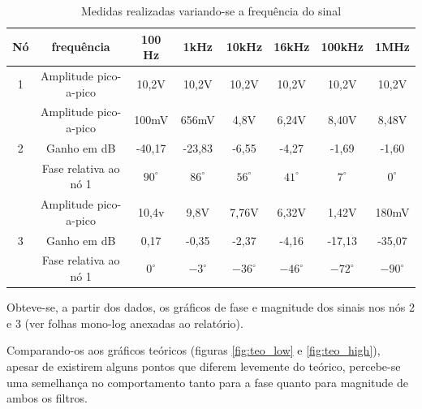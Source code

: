 \documentclass[a4paper]{article} %
\begin{document}

%
\begin{table}[h]
\begin{centering}
\caption{Medidas realizadas variando-se a frequência do sinal \label{tab:var-freq}}
\begin{tabular}{|c|c|c|c|c|c|c|c|}
\hline 
Nó & frequência & 100 Hz & 1kHz & 10kHz & 16kHz & 100kHz & 1MHz\tabularnewline
\hline
\hline 
1 & Amplitude pico-a-pico & 10,2V & 10,2V  & 10,2V & 10,2V & 10,2V  &10,2V \tabularnewline
\hline 
\multirow{3}{*}{2}
 & Amplitude pico-a-pico & 100mV & 656mV & 4,8V & 6,24V & 8,40V & 8,48V \tabularnewline
\cline{2-8} 
 & \multicolumn{1}{c|}{Ganho em dB} & -40,17 & -23,83  & -6,55 & -4,27  & -1,69  & -1,60 \tabularnewline
\cline{2-8} 

 & Fase relativa ao nó 1 & $90^{\circ}$ & $86^{\circ}$  & $56^{\circ}$  & $41^{\circ}$  & $7^{\circ}$  & $0^{\circ}$ \tabularnewline
\hline 
\multirow{3}{*}{3}
 & Amplitude pico-a-pico & 10,4v & 9,8V & 7,76V & 6,32V  & 1,42V  & 180mV \tabularnewline
\cline{2-8} 
 
 & Ganho em dB &  0,17 & -0,35  & -2,37 & -4,16 & -17,13 & -35,07\tabularnewline
\cline{2-8} 
 
 & Fase relativa ao nó 1 & $0^{\circ}$ & $-3^{\circ}$ & $-36^{\circ}$  & $-46^{\circ}$  & $-72^{\circ}$  & $-90^{\circ}$ \tabularnewline
\hline
\end{tabular}
\par\end{centering}

\end{table}


Obteve-se, a partir dos dados, os gráficos de fase e magnitude dos sinais nos nós 2 e 3 (ver folhas mono-log anexadas ao relatório).

Comparando-os aos gráficos teóricos (figuras \ref{fig:teo_low} e \ref{fig:teo_high}), apesar de existirem alguns pontos que diferem levemente do teórico, percebe-se uma semelhança no comportamento tanto para a fase quanto para magnitude de ambos os filtros.   
\end{document}

